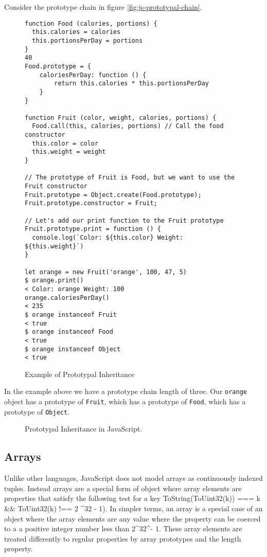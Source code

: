\documentclass[]{final_report}
\begin{document}
Consider the prototype chain in figure \ref{fig:js-prototypal-chain}.

\begin{figure}[h]
\begin{verbatim}
function Food (calories, portions) {
  this.calories = calories
  this.portionsPerDay = portions
}
40
Food.prototype = {
	caloriesPerDay: function () {
		return this.calories * this.portionsPerDay
	}
}

function Fruit (color, weight, calories, portions) {
  Food.call(this, calories, portions) // Call the food constructor
  this.color = color
  this.weight = weight
}

// The prototype of Fruit is Food, but we want to use the Fruit constructor
Fruit.prototype = Object.create(Food.prototype);
Fruit.prototype.constructor = Fruit;

// Let's add our print function to the Fruit prototype
Fruit.prototype.print = function () {
  console.log(`Color: ${this.color} Weight: ${this.weight}`)
}

let orange = new Fruit('orange', 100, 47, 5)
$ orange.print()
< Color: orange Weight: 100
orange.caloriesPerDay()
< 235
$ orange instanceof Fruit
< true
$ orange instanceof Food
< true
$ orange instanceof Object
< true
\end{verbatim}
\caption{\label{fig:js-prototypical-inheritance} Example of Prototypal Inheritance}
\end{figure} 

In the example above we have a prototype chain length of three. Our \lstinline{orange} object has a prototype of \lstinline{Fruit}, which has a prototype of \lstinline{Food}, which has a prototype of \lstinline{Object}.

\begin{figure}[h]
\centering
\fboxsep 2mm
\caption{\label{fig:fig:js-prototypal-chain} Prototypal Inheritance in JavaScript.}
\end{figure} 

\subsection{Arrays}
Unlike other languages, JavaScript does not model arrays as continuously indexed tuples. Instead arrays are  a special form of object where array elements are properties that satisfy the following test for a key ToString(ToUint32(k)) === k \&\& ToUint32(k) !== 2 \textasciicircum 32 - 1). In simpler terms, an array is a special case of an object where the array elements are any value where the property can be coerced to a a positive integer number less than 2\textasciicircum32\textasciicircum - 1. These array elements are treated differently to regular properties by array prototypes and the length property. 
\end{document}
